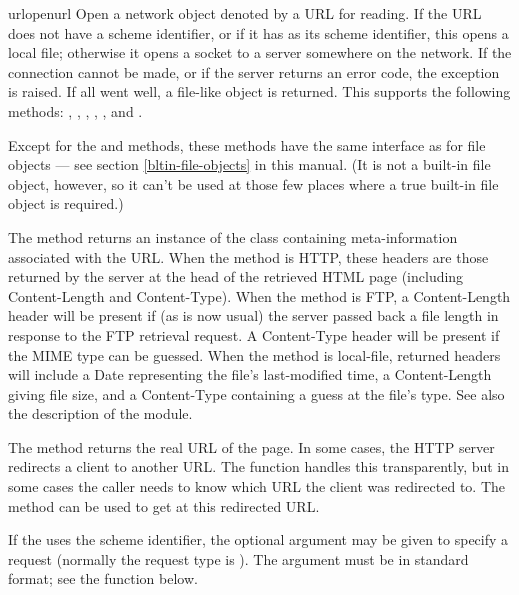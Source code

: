 \begin{funcdesc}{urlopen}{url}
Open a network object denoted by a URL for reading.  If the URL does
not have a scheme identifier, or if it has  as its scheme
identifier, this opens a local file; otherwise it opens a socket to a
server somewhere on the network.  If the connection cannot be made, or
if the server returns an error code, the  exception
is raised.  If all went well, a file-like object is returned.  This
supports the following methods: , ,
, , ,
 and .

Except for the  and  methods,
these methods have the same interface as for
file objects --- see section \ref{bltin-file-objects} in this
manual.  (It is not a built-in file object, however, so it can't be
used at those few places where a true built-in file object is
required.)

The  method returns an instance of the class
 containing meta-information associated
with the URL.  When the method is HTTP, these headers are those
returned by the server at the head of the retrieved HTML page
(including Content-Length and Content-Type).  When the method is FTP,
a Content-Length header will be present if (as is now usual) the
server passed back a file length in response to the FTP retrieval
request. A Content-Type header will be present if the MIME type can
be guessed.  When the method is local-file, returned headers will include
a Date representing the file's last-modified time, a Content-Length
giving file size, and a Content-Type containing a guess at the file's
type. See also the description of the
 module.

The  method returns the real URL of the page.  In
some cases, the HTTP server redirects a client to another URL.  The
 function handles this transparently, but in some
cases the caller needs to know which URL the client was redirected
to.  The  method can be used to get at this
redirected URL.

If the  uses the  scheme identifier, the optional
 argument may be given to specify a  request
(normally the request type is ).  The  argument
must be in standard  format;
see the  function below.


\end{funcdesc}
